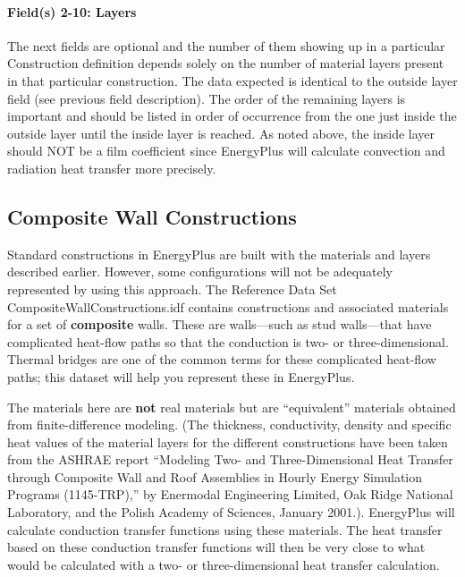 \paragraph{Field(s) 2-10: Layers}\label{fields-2-10-layers-1}

The next fields are optional and the number of them showing up in a particular Construction definition depends solely on the number of material layers present in that particular construction. The data expected is identical to the outside layer field (see previous field description). The order of the remaining layers is important and should be listed in order of occurrence from the one just inside the outside layer until the inside layer is reached. As noted above, the inside layer should NOT be a film coefficient since EnergyPlus will calculate convection and radiation heat transfer more precisely.

\subsection{Composite Wall Constructions}\label{composite-wall-constructions}

Standard constructions in EnergyPlus are built with the materials and layers described earlier. However, some configurations will not be adequately represented by using this approach. The Reference Data Set CompositeWallConstructions.idf contains constructions and associated materials for a set of \textbf{composite} walls. These are walls---such as stud walls---that have complicated heat-flow paths so that the conduction is two- or three-dimensional. Thermal bridges are one of the common terms for these complicated heat-flow paths; this dataset will help you represent these in EnergyPlus.

The materials here are \textbf{not} real materials but are ``equivalent'' materials obtained from finite-difference modeling. (The thickness, conductivity, density and specific heat values of the material layers for the different constructions have been taken from the ASHRAE report ``Modeling Two- and Three-Dimensional Heat Transfer through Composite Wall and Roof Assemblies in Hourly Energy Simulation Programs (1145-TRP),'' by Enermodal Engineering Limited, Oak Ridge National Laboratory, and the Polish Academy of Sciences, January 2001.). EnergyPlus will calculate conduction transfer functions using these materials. The heat transfer based on these conduction transfer functions will then be very close to what would be calculated with a two- or three-dimensional heat transfer calculation.


